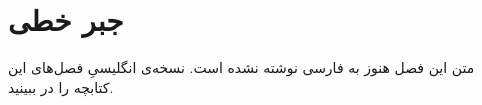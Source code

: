\chapter{جبر خطی}
\label{ch:03-linear-algebra-fa-01}

متن این فصل هنوز به فارسی نوشته نشده است. نسخه‌ی انگلیسیِ فصل‌های این کتابچه را در  ببینید.
